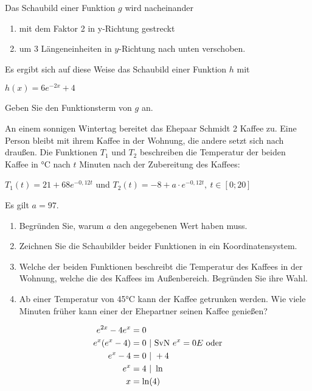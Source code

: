 \begin{Exercise}[title={Zeitansatz 8 min, ohne Taschenrechner}, label=eFktVA_14]%

Das Schaubild einer Funktion \(g\) wird nacheinander
\begin{enumerate}
    \item mit dem Faktor 2 in y-Richtung gestreckt
    \item um 3 Längeneinheiten in \(y\)-Richtung nach unten verschoben.
\end{enumerate}
Es ergibt sich auf diese Weise das Schaubild einer Funktion \(h\) mit

\(h(x)=6e^{-2x}+4\)

Geben Sie den Funktionsterm von \(g\) an.
\end{Exercise}
\begin{Exercise}[title={Zeitansatz 28 min, mit Taschenrechner}, label=eFktVA_15]%

An einem sonnigen Wintertag bereitet das Ehepaar Schmidt 2 Kaffee zu. Eine Person bleibt mit ihrem Kaffee in der Wohnung, die andere setzt sich nach draußen. Die Funktionen \(T_1\) und \(T_2\) beschreiben die Temperatur der beiden Kaffee in °C nach \(t\) Minuten nach der Zubereitung des Kaffees:

\(T_1(t)=21+68e^{-0,12t}\) und \(T_2(t)=-8+a\cdot e^{-0,12t},\ t\in[0;20]\)

Es gilt \(a=97\).
\begin{enumerate}[label=\alph*)]
    \item Begründen Sie, warum \(a\) den angegebenen Wert haben muss.
    \item Zeichnen Sie die Schaubilder beider Funktionen in ein Koordinatensystem.
    \item Welche der beiden Funktionen beschreibt die Temperatur des Kaffees in der Wohnung, welche die des Kaffees im Außenbereich. Begründen Sie ihre Wahl.
    \item Ab einer Temperatur von 45°C kann der Kaffee getrunken werden. Wie viele Minuten früher kann einer der Ehepartner seinen Kaffee genießen?
\end{enumerate}
\end{Exercise}
\newpage
\begin{Answer}[ref=eFktVA_1]
    \begin{align*}
        e^{2x}-4e^x&=0\\
        e^x\left(e^x-4\right)&=0\ \vert\ \text{SvN }e^x=0\Lightning\text{ oder}\\
        e^x-4&=0\ \vert\ +4\\
        e^x&=4\ \vert\ \ln\\
        x&=\ln(4)
    \end{align*}
\end{Answer}
